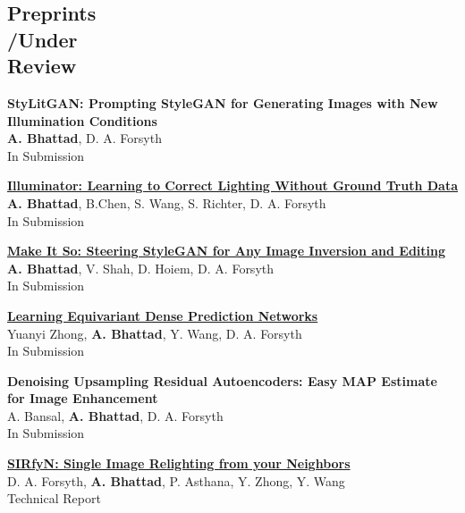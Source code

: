 \documentclass[margin,line]{res}
\begin{document}
\begin{resume}
\section{\sc Preprints\\/Under \\Review}
\renewcommand*{\labelenumi}{\theenumi.}
\begin{etaremune}[start=6, leftmargin=15pt]
\item {\bf {StyLitGAN: Prompting StyleGAN for Generating Images with New Illumination Conditions}} \\{{\bf A. Bhattad}, D. A. Forsyth} \\
In Submission
\item {\bf \href{}{Illuminator: Learning to Correct Lighting Without Ground Truth Data}} \\{{\bf A. Bhattad}, B.Chen, S. Wang, S. Richter, D. A. Forsyth}\\
In Submission
\item {\bf \href{}{Make It So: Steering StyleGAN for Any Image Inversion and Editing}} \\{{\bf A. Bhattad}, V. Shah, D. Hoiem, D. A. Forsyth}\\
In Submission
\item {\bf \href{}{Learning Equivariant Dense Prediction Networks}} \\{Yuanyi Zhong, {\bf A. Bhattad}, Y. Wang, D. A. Forsyth}\\
In Submission
\item {\bf Denoising Upsampling Residual Autoencoders: Easy MAP Estimate for Image Enhancement} \\
{A. Bansal, {\bf A. Bhattad}, D. A. Forsyth}\\
In Submission
\item {\bf \href{https://arxiv.org/abs/2112.04497}{SIRfyN: Single Image Relighting from your Neighbors }} \\{D. A. Forsyth, {\bf A. Bhattad}, P. Asthana, Y. Zhong, Y. Wang}\\
Technical Report
\end{etaremune}

\end{resume}
\end{document}
